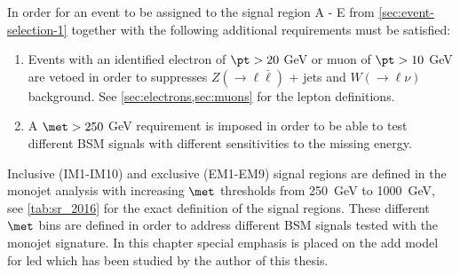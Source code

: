 In order for an event to be assigned to the signal region A - E from
\cref{sec:event-selection-1} together with the following additional requirements
must be satisfied:
\begin{enumerate}[A -]
\item Events with an identified electron of $\pt > 20~$GeV or muon of
  $\pt > 10~$GeV are vetoed in order to suppresses
  $Z (\rightarrow \ell \bar{\ell})$ + jets and $W (\rightarrow \ell \nu)$
  background. See \cref{sec:electrons,sec:muons} for the lepton definitions.
\item A $\met > 250~$GeV requirement is imposed in order to be able to test
  different BSM signals with different sensitivities to the missing energy.
\end{enumerate}
Inclusive (IM1-IM10) and exclusive (EM1-EM9) signal regions are defined in the
monojet analysis with increasing $\met$ thresholds from 250~GeV to 1000~GeV, see
\cref{tab:sr_2016} for the exact definition of the signal regions. These
different $\met$ bins are defined in order to address different BSM signals
tested with the monojet signature. In this chapter special emphasis is placed on
the \gls{add} model for \gls{led} which has been studied by the author of this
thesis.
